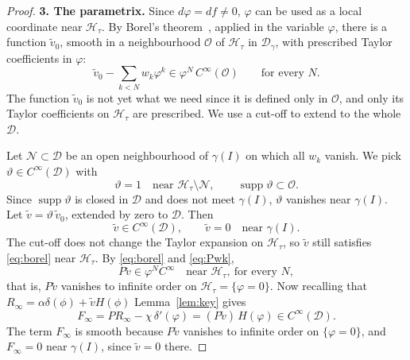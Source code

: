 \documentclass[12pt,reqno]{amsart}
\numberwithin{equation}{section}
\theoremstyle{definition}
\theoremstyle{plain}
\theoremstyle{definition}
\theoremstyle{definition}
\newcommand{\D}{\mathcal{D}}
\newcommand{\Ht}{\mathcal{H}_{\tau}}
\newcommand{\dg}{\D_\gamma}
\DeclareMathOperator{\supp}{supp}
\begin{document}
\begin{proof}
\medskip\noindent
\textbf{3. The parametrix.}
Since $d\varphi=df\neq0$, $\varphi$ can be used as a local coordinate near $\Ht$. By Borel's theorem~\cite[Theorem 1.2.6]{hormander1990}, applied in the variable $\varphi$, there is a function $\widetilde v_0$, smooth in a neighbourhood $\mathcal O$ of $\Ht$ in $\dg$, with prescribed Taylor coefficients in $\varphi$:
\begin{equation}
  \widetilde v_0-\sum_{k<N}w_k\varphi^k\in\varphi^N\,C^\infty(\mathcal O)\qquad\text{for every }N .
  \label{eq:borel}
\end{equation}
The function $\widetilde v_0$ is not yet what we need since it is defined only in $\mathcal O$, and only its Taylor coefficients on $\Ht$ are prescribed. We use a cut-off to extend to the whole $\mathcal D$.

Let $\mathcal N\subset\D$ be an open neighbourhood of $\gamma(I)$ on which all $w_k$ vanish. We pick $\vartheta\in C^\infty(\D)$ with
\begin{equation*}
\vartheta=1\quad\text{near }\Ht\setminus\mathcal N,
\qquad
\supp\vartheta\subset\mathcal O .
\end{equation*}
Since $\supp\vartheta$ is closed in $\D$ and does not meet $\gamma(I)$, $\vartheta$ vanishes near $\gamma(I)$. Let $\widetilde v=\vartheta\,\widetilde v_0$, extended by zero to $\D$. Then
\begin{equation*}
\widetilde v\in C^\infty(\D),
\qquad
\widetilde v=0\quad\text{near }\gamma(I).
\end{equation*}
The cut-off does not change the Taylor expansion on $\Ht$, so $\widetilde v$ still satisfies \eqref{eq:borel} near $\Ht$. By \eqref{eq:borel} and \eqref{eq:Pwk},
\begin{equation*}
P\widetilde v\in\varphi^NC^\infty\quad\text{near }\Ht,\ \text{for every }N,
\end{equation*}
that is, $P\widetilde v$ vanishes to infinite order on $\Ht=\{\varphi=0\}$. Now recalling that $R_\infty=\alpha \delta(\phi)+\tilde{v}H(\phi)$ Lemma~\ref{lem:key} gives
\begin{equation}
  F_\infty
  =
  PR_\infty-\chi\,\delta'(\varphi)
  =
  (P\widetilde{v})\,H(\varphi)
  \in C^\infty(\mathcal{D}).
  \label{eq:Finfty}
\end{equation}
The term $F_\infty$ is smooth because $P\widetilde v$ vanishes to infinite order on $\{\varphi=0\}$, and $F_\infty=0$ near $\gamma(I)$, since $\widetilde v=0$ there.


\end{proof}
\end{document}
